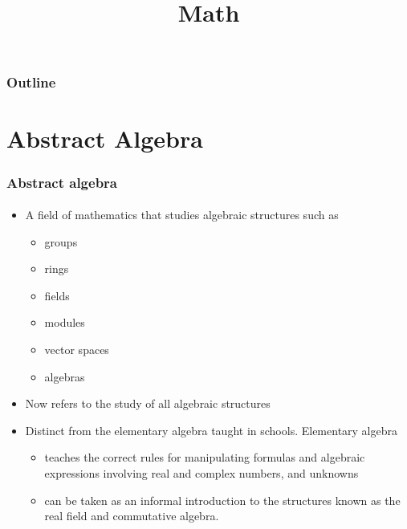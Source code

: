 
\title{Math}
\begin{frame}[plain]\logoTechTower
	\titlepage
\end{frame}

\begin{frame}
\frametitle{Outline}
\logoCSIPCPL\logoTechTower
	\setcounter{tocdepth}{1}	
	\tableofcontents
\end{frame}


\section{Abstract Algebra}
\begin{frame}
\frametitle{Abstract algebra}
\framesubtitle{}
\logoCSIPCPL\mypagenum\mypagenum
	\begin{itemize}
		\item A field of mathematics that studies algebraic structures such as
			\begin{itemize}
				\item groups
				\item rings
				\item fields
				\item modules
				\item vector spaces
				\item algebras
			\end{itemize}
		\item Now refers to the study of all algebraic structures
		\item Distinct from the elementary algebra taught in
	schools.  Elementary algebra
		\begin{itemize}
			\item teaches the correct rules for manipulating formulas
	and algebraic expressions involving real and complex numbers, and
	unknowns
		\item can be taken as an informal
	introduction to the structures known as the real field and
	commutative algebra.
		\end{itemize}
	\end{itemize}
\end{frame}



